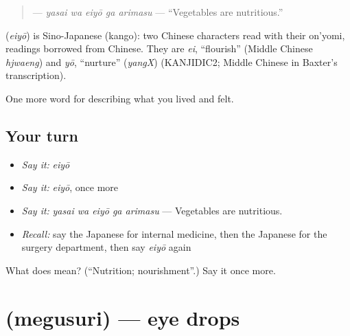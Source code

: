 \begin{quote}
\textbf{  } — \emph{yasai wa eiyō ga arimasu} — \textquotedblleft{}Vegetables are nutritious.\textquotedblright{}
\end{quote}

\begin{cousinweb}
\textbf{} (\emph{eiyō}) is Sino-Japanese (kango): two Chinese characters read with their on'yomi, readings borrowed from Chinese. They are \emph{ei}, \textquotedblleft{}flourish\textquotedblright{} (Middle Chinese \emph{hjwaeng}) and \emph{yō}, \textquotedblleft{}nurture\textquotedblright{} (\emph{yangX}) (KANJIDIC2; Middle Chinese in Baxter's transcription).
\end{cousinweb}

\begin{grammarlens}[title={What you've built}]
One more word for describing what you lived and felt.
\end{grammarlens}

\subsection*{Your turn}
\begin{itemize}
\raggedright
  \item \emph{Say it:} \emph{eiyō}
  \item \emph{Say it:} \emph{eiyō}, once more
  \item \emph{Say it:} \emph{yasai wa eiyō ga arimasu} — Vegetables are nutritious.
  \item \emph{Recall:} say the Japanese for internal medicine, then the Japanese for the surgery department, then say \emph{eiyō} again
\end{itemize}

\begin{tcolorbox}[breakable,colback=teal!4,colframe=teal!35!black,title={Before you move on}]
What does  mean? (\textquotedblleft{}Nutrition; nourishment\textquotedblright{}.) Say it once more.
\end{tcolorbox}
\section[\texorpdfstring{\ja{めぐすり} (megusuri)}{めぐすり (megusuri)}]{ (megusuri) — eye drops}

\label{lesson:JA-C450-megusuri}



